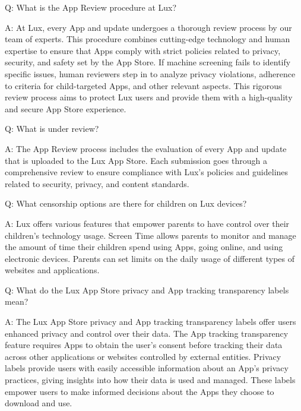 \documentclass[11pt]{article}
\begin{document}
Q: What is the App Review procedure at Lux?


A: At Lux, every App and update undergoes a thorough review process by our team of experts. This procedure combines cutting-edge technology and human expertise to ensure that Apps comply with strict policies related to privacy, security, and safety set by the App Store. If machine screening fails to identify specific issues, human reviewers step in to analyze privacy violations, adherence to criteria for child-targeted Apps, and other relevant aspects. This rigorous review process aims to protect Lux users and provide them with a high-quality and secure App Store experience.


Q: What is under review?


A: The App Review process includes the evaluation of every App and update that is uploaded to the Lux App Store. Each submission goes through a comprehensive review to ensure compliance with Lux's policies and guidelines related to security, privacy, and content standards.


Q: What censorship options are there for children on Lux devices?


A: Lux offers various features that empower parents to have control over their children's technology usage. Screen Time allows parents to monitor and manage the amount of time their children spend using Apps, going online, and using electronic devices. Parents can set limits on the daily usage of different types of websites and applications.


Q: What do the Lux App Store privacy and App tracking transparency labels mean?


A: The Lux App Store privacy and App tracking transparency labels offer users enhanced privacy and control over their data. The App tracking transparency feature requires Apps to obtain the user's consent before tracking their data across other applications or websites controlled by external entities. Privacy labels provide users with easily accessible information about an App's privacy practices, giving insights into how their data is used and managed. These labels empower users to make informed decisions about the Apps they choose to download and use.
\end{document}
